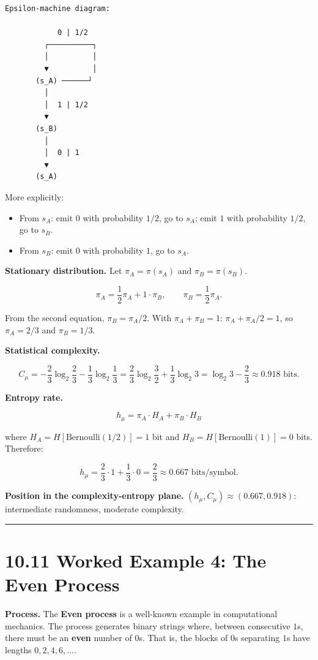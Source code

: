 \begin{lstlisting}
Epsilon-machine diagram:

            0 | 1/2
         ┌──────────┐
         │          │
         ▼          │
       (s_A) ──────┘
         │
         │  1 | 1/2
         ▼
       (s_B)
         │
         │  0 | 1
         ▼
       (s_A)
\end{lstlisting}

More explicitly:
\begin{itemize}
  \item From $s_A$: emit $0$ with probability $1/2$, go to $s_A$; emit $1$ with probability $1/2$, go to $s_B$.
  \item From $s_B$: emit $0$ with probability $1$, go to $s_A$.
\end{itemize}

\textbf{Stationary distribution.} Let $\pi_A = \pi(s_A)$ and $\pi_B = \pi(s_B)$.

\[
\pi_A = \frac{1}{2}\pi_A + 1 \cdot \pi_B, \qquad \pi_B = \frac{1}{2}\pi_A.
\]

From the second equation, $\pi_B = \pi_A/2$. With $\pi_A + \pi_B = 1$: $\pi_A + \pi_A/2 = 1$, so $\pi_A = 2/3$ and $\pi_B = 1/3$.

\textbf{Statistical complexity.}

\[
C_\mu = -\frac{2}{3}\log_2\frac{2}{3} - \frac{1}{3}\log_2\frac{1}{3} = \frac{2}{3}\log_2\frac{3}{2} + \frac{1}{3}\log_2 3 = \log_2 3 - \frac{2}{3} \approx 0.918 \text{ bits}.
\]

\textbf{Entropy rate.}

\[
h_\mu = \pi_A \cdot H_A + \pi_B \cdot H_B
\]

where $H_A = H[\text{Bernoulli}(1/2)] = 1$ bit and $H_B = H[\text{Bernoulli}(1)] = 0$ bits. Therefore:

\[
h_\mu = \frac{2}{3} \cdot 1 + \frac{1}{3} \cdot 0 = \frac{2}{3} \approx 0.667 \text{ bits/symbol}.
\]

\textbf{Position in the complexity-entropy plane.} $(h_\mu, C_\mu) \approx (0.667, 0.918)$: intermediate randomness, moderate complexity.

\bigskip\hrule\bigskip

\section{10.11 Worked Example 4: The Even Process}

\textbf{Process.} The \textbf{Even process} is a well-known example in computational mechanics. The process generates binary strings where, between consecutive $1$s, there must be an \textbf{even} number of $0$s. That is, the blocks of $0$s separating $1$s have lengths $0, 2, 4, 6, \ldots$.

